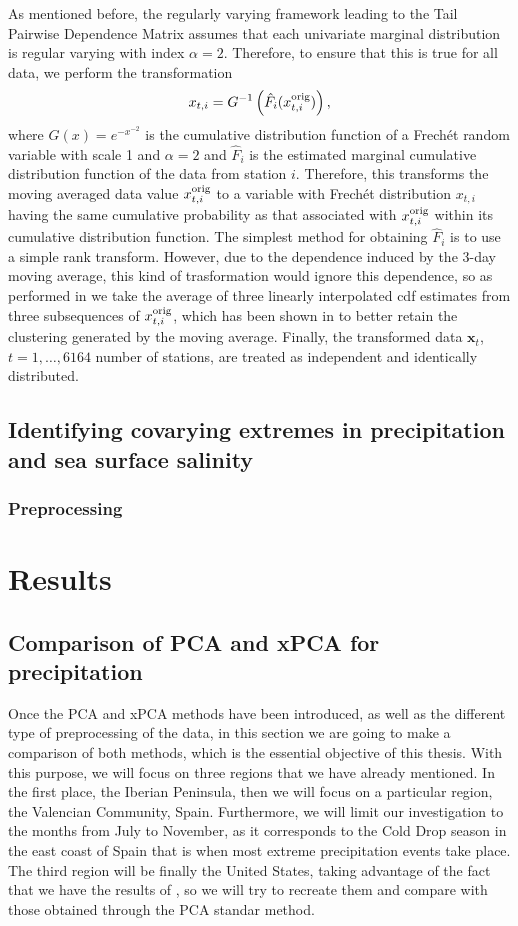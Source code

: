 \documentclass[11pt, oneside]{book}
\theoremstyle{plain}
\theoremstyle{remark}
\newcommand*{\mbf}[1]{\mathbf{#1}}
\begin{document}
As mentioned before, the regularly varying framework leading to the Tail
Pairwise Dependence Matrix assumes that each univariate marginal distribution is
regular varying with index $\alpha=2$. Therefore, to ensure that this is true
for all data, we perform the transformation  $$x_{t,i} =
G^{-1}\left(\hat{F}_i(x_{t,i}^{\rm orig})\right),$$ where $G(x) = e^{-x^{-2}}$
is the cumulative distribution function of a Frechét random variable with scale
1 and $\alpha=2$ and $\hat{F}_i$ is the estimated marginal cumulative
distribution function of the data from station $i$. Therefore, this transforms
the moving averaged data value $x_{t,i}^{\rm orig}$ to a variable with Frechét
distribution $x_{t,i}$ having the same cumulative probability as that associated
with $x_{t,i}^{\rm orig}$ within its cumulative distribution function. The
simplest method for obtaining $\hat{F}_i$ is to use a simple rank transform.
However, due to the dependence induced by the 3-day moving average, this kind of
trasformation would ignore this dependence, so as performed in
\cite{jiang-cooley} we take the average of three linearly interpolated cdf
estimates from three subsequences of $x_{t,i}^{\rm orig}$, which has been shown
in \cite{jiang-cooley} to better retain the clustering generated by the moving
average. Finally, the transformed data $\mbf{x}_t$, $t=1,\dots,6164$ number of
stations, are treated as independent and identically distributed.

\section{Identifying covarying extremes in precipitation and sea surface
salinity}
\subsection{Preprocessing}  


\chapter{Results}
\section{Comparison of PCA and xPCA for precipitation}
Once the PCA and xPCA methods have been introduced, as well as the different
type of preprocessing of the data, in this section we are going to make a
comparison of both methods, which is the essential objective of this thesis.
With this purpose, we will focus on three regions that we have already
mentioned. In the first place, the Iberian Peninsula, then we will focus on a
particular region, the Valencian Community, Spain. Furthermore, we will limit
our investigation to the months from July to November, as it corresponds to the
Cold Drop season in the east coast of Spain that is when most extreme
precipitation events take place. The third region will be finally the United
States, taking advantage of the fact that we have the results of
\cite{jiang-cooley}, so we will try to recreate them and compare with those
obtained through the PCA standar method. 
\end{document}
